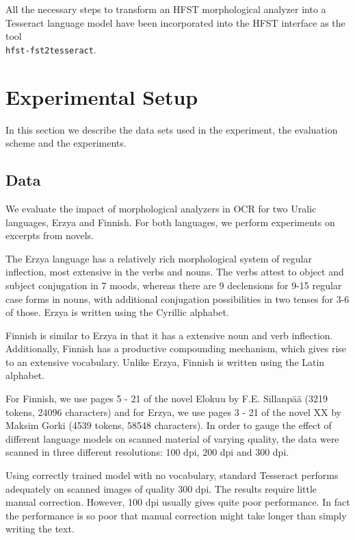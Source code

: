 \documentclass[b5paper]{article}
\begin{document}
All the necessary steps to transform an HFST morphological analyzer
into a Tesseract language model have been incorporated into the HFST
interface as the tool\\{\tt hfst-fst2tesseract}.

\section{Experimental Setup}
\label{exp}

In this section we describe the data sets used in the experiment, the
evaluation scheme and the experiments.

\subsection{Data}
We evaluate the impact of morphological analyzers in OCR for two
Uralic languages, Erzya and Finnish. For both languages, we perform
experiments on excerpts from novels.
 
The Erzya language has a relatively rich morphological system of
regular inflection, most extensive in the verbs and nouns. The verbs
attest to object and subject conjugation in 7 moods, whereas there are
9 declensions for 9-15 regular case forms in nouns, with additional
conjugation possibilities in two tenses for 3-6 of those. Erzya is
written using the Cyrillic alphabet.

Finnish is similar to Erzya in that it has a extensive noun and verb
inflection. Additionally, Finnish has a productive compounding
mechanism, which gives rise to an extensive vocabulary. Unlike Erzya,
Finnish is written using the Latin alphabet.

For Finnish, we use pages 5 - 21 of the novel Elokuu by
F.E. Sillanp\"{a}\"{a} \cite{sillanpaa08} (3219 tokens, 24096 characters) and for Erzya, we use pages
3 - 21 of the novel XX by Maksim Gorki \cite{gorki} (4539 tokens, 58548 characters). In order to gauge
the effect of different language models on scanned material of varying
quality, the data were scanned in three different resolutions: 100
dpi, 200 dpi and 300 dpi.

Using correctly trained model with no vocabulary, standard Tesseract
performs adequately on scanned images of quality 300 dpi. The results
require little manual correction. However, 100 dpi usually gives quite
poor performance. In fact the performance is so poor that manual
correction might take longer than simply writing the text.
\end{document}
